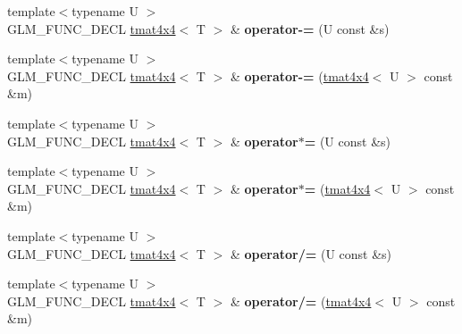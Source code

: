 \begin{DoxyCompactItemize}
\item 
\hypertarget{structglm_1_1detail_1_1tmat4x4_a8ec28385da09ad2ff5a749ad312390e3}{}{\footnotesize template$<$typename U $>$ }\\G\+L\+M\+\_\+\+F\+U\+N\+C\+\_\+\+D\+E\+C\+L \hyperlink{structglm_1_1detail_1_1tmat4x4}{tmat4x4}$<$ T $>$ \& {\bfseries operator-\/=} (U const \&s)\label{structglm_1_1detail_1_1tmat4x4_a8ec28385da09ad2ff5a749ad312390e3}

\item 
\hypertarget{structglm_1_1detail_1_1tmat4x4_adfea448305e104849f610918a7fcb52e}{}{\footnotesize template$<$typename U $>$ }\\G\+L\+M\+\_\+\+F\+U\+N\+C\+\_\+\+D\+E\+C\+L \hyperlink{structglm_1_1detail_1_1tmat4x4}{tmat4x4}$<$ T $>$ \& {\bfseries operator-\/=} (\hyperlink{structglm_1_1detail_1_1tmat4x4}{tmat4x4}$<$ U $>$ const \&m)\label{structglm_1_1detail_1_1tmat4x4_adfea448305e104849f610918a7fcb52e}

\item 
\hypertarget{structglm_1_1detail_1_1tmat4x4_ab6b5928af3defe6294781e7f4986005f}{}{\footnotesize template$<$typename U $>$ }\\G\+L\+M\+\_\+\+F\+U\+N\+C\+\_\+\+D\+E\+C\+L \hyperlink{structglm_1_1detail_1_1tmat4x4}{tmat4x4}$<$ T $>$ \& {\bfseries operator$\ast$=} (U const \&s)\label{structglm_1_1detail_1_1tmat4x4_ab6b5928af3defe6294781e7f4986005f}

\item 
\hypertarget{structglm_1_1detail_1_1tmat4x4_a982bc2cf263dd6e85bb802c7812871b0}{}{\footnotesize template$<$typename U $>$ }\\G\+L\+M\+\_\+\+F\+U\+N\+C\+\_\+\+D\+E\+C\+L \hyperlink{structglm_1_1detail_1_1tmat4x4}{tmat4x4}$<$ T $>$ \& {\bfseries operator$\ast$=} (\hyperlink{structglm_1_1detail_1_1tmat4x4}{tmat4x4}$<$ U $>$ const \&m)\label{structglm_1_1detail_1_1tmat4x4_a982bc2cf263dd6e85bb802c7812871b0}

\item 
\hypertarget{structglm_1_1detail_1_1tmat4x4_a5428eec9c39ed1a4115d33ae720a802f}{}{\footnotesize template$<$typename U $>$ }\\G\+L\+M\+\_\+\+F\+U\+N\+C\+\_\+\+D\+E\+C\+L \hyperlink{structglm_1_1detail_1_1tmat4x4}{tmat4x4}$<$ T $>$ \& {\bfseries operator/=} (U const \&s)\label{structglm_1_1detail_1_1tmat4x4_a5428eec9c39ed1a4115d33ae720a802f}

\item 
\hypertarget{structglm_1_1detail_1_1tmat4x4_ac228a623520be677120f66ad4cfa77af}{}{\footnotesize template$<$typename U $>$ }\\G\+L\+M\+\_\+\+F\+U\+N\+C\+\_\+\+D\+E\+C\+L \hyperlink{structglm_1_1detail_1_1tmat4x4}{tmat4x4}$<$ T $>$ \& {\bfseries operator/=} (\hyperlink{structglm_1_1detail_1_1tmat4x4}{tmat4x4}$<$ U $>$ const \&m)\label{structglm_1_1detail_1_1tmat4x4_ac228a623520be677120f66ad4cfa77af}


\end{DoxyCompactItemize}
